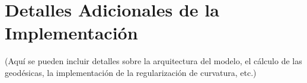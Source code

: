 \section{Detalles Adicionales de la Implementación}
(Aquí se pueden incluir detalles sobre la arquitectura del modelo, el cálculo de las geodésicas, la implementación de la regularización de curvatura, etc.)
